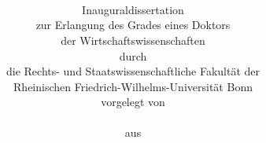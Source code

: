





\frontmatter  %


\noindent%
\begin{center}
\begin{minipage}[t][0.99\textheight][t]{0.9\textwidth}
\title{\sffamily\bfseries\linespread{0.975}\LARGE{}%
	~\\[-10ex]
	\disstitle%
}
\author{\large{}%
	\\[10ex]%
		{\Large Inauguraldissertation}%
	\\[3ex]%
	zur Erlangung des Grades eines Doktors \\%
	der Wirtschaftswissenschaften \\[1.55ex]%
	durch \\[1.5ex]%
	die Rechts- und Staatswissenschaftliche Fakultät der \\%
	Rheinischen Friedrich-Wilhelms-Universität Bonn \\[3ex]%
	vorgelegt von \\[3ex]%
	\textbf{%
		{\Large \dissauthor}
	}
	\\[3ex]%
	aus \dissbornin
}
\ifnum {}%
	\date{%
		\vspace{15ex}%
		{\Large\dissyear}%
		\vfill%
	}%
\else%
	\date{%
		\vfill%
	}%
\fi

\maketitle
\end{minipage}
\end{center}

\thispagestyle{empty}







\newpage
\thispagestyle{empty}

\ifnum {}
	\mbox{\hspace{0pt}}	%
	\vfill
	
